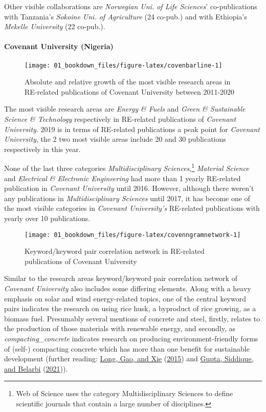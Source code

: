 \documentclass[12pt,twoside]{report}
\let\oldparagraph\paragraph
\renewcommand{\paragraph}[1]{\oldparagraph{#1}\mbox{}}
\let\rmarkdownfootnote\footnote%
\def\footnote{\protect\rmarkdownfootnote}
\begin{document}
Other visible collaborations are \emph{Norwegian Uni. of Life Sciences}' co-publications with Tanzania's \emph{Sokoine Uni. of Agriculture} (24 co-pub.) and with Ethiopia's \emph{Mekelle University} (22 co-pub.).

\hypertarget{covenant-university-nigeria}{%
\paragraph{Covenant University (Nigeria)}\label{covenant-university-nigeria}}

\begin{figure}
\texttt{[image: 01\_bookdown\_files/figure-latex/covenbarline-1]} \caption{Absolute and relative growth of the most visible research areas in RE-related publications of Covenant University between 2011-2020}\label{fig:covenbarline}
\end{figure}

The most visible research areas are \emph{Energy \& Fuels} and \emph{Green \& Sustainable Science \& Technology} respectively in RE-related publications of \emph{Covenant University}. 2019 is in terms of RE-related publications a peak point for \emph{Covenant University}, the 2 two most visible areas include 20 and 30 publications respectively in this year.

None of the last three categories \emph{Multidisciplinary Sciences},\footnote{Web of Science uses the category Multidisciplinary Sciences to define scientific journals that contain a large number of disciplines.} \emph{Material Science} and \emph{Electrical \& Electronic Engineering} had more than 1 yearly RE-related publication in \emph{Covenant University} until 2016. However, although there weren't any publications in \emph{Multidisciplinary Sciences} until 2017, it has become one of the most visible categories in \emph{Covenant University's} RE-related publications with yearly over 10 publications.

\begin{figure}
\texttt{[image: 01\_bookdown\_files/figure-latex/covenngramnetwork-1]} \caption{Keyword/keyword pair correlation network in RE-related publications of Covenant University}\label{fig:covenngramnetwork}
\end{figure}

Similar to the research areas keyword/keyword pair correlation network of \emph{Covenant University} also includes some differing elements. Along with a heavy emphasis on solar and wind energy-related topics, one of the central keyword pairs indicates the research on using rice husk, a byproduct of rice growing, as a biomass fuel. Presumably several mentions of concrete and steel, firstly, relates to the production of those materials with renewable energy, and secondly, as \emph{compacting\_concrete} indicates research on producing environment-friendly forms of (self-) compacting concrete which has more than one benefit for sustainable development (further reading: \protect\hyperlink{ref-long2015}{Long, Gao, and Xie} (\protect\hyperlink{ref-long2015}{2015}) and \protect\hyperlink{ref-gupta2021}{Gupta, Siddique, and Belarbi} (\protect\hyperlink{ref-gupta2021}{2021})).
\end{document}
